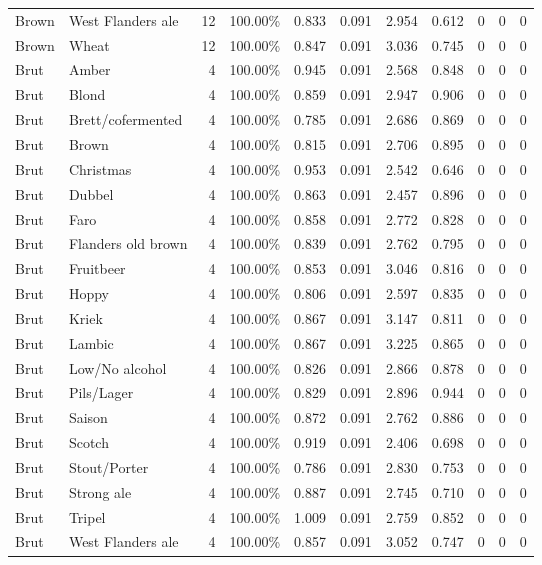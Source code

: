 {\begin{longtable}{llrrrrrrrrr}
Brown & West Flanders ale & 12 & 100.00\% & 0.833 & 0.091 & 2.954 & 0.612 & 0 & 0 & 0 \\
Brown & Wheat & 12 & 100.00\% & 0.847 & 0.091 & 3.036 & 0.745 & 0 & 0 & 0 \\
Brut & Amber & 4 & 100.00\% & 0.945 & 0.091 & 2.568 & 0.848 & 0 & 0 & 0 \\
Brut & Blond & 4 & 100.00\% & 0.859 & 0.091 & 2.947 & 0.906 & 0 & 0 & 0 \\
Brut & Brett/cofermented & 4 & 100.00\% & 0.785 & 0.091 & 2.686 & 0.869 & 0 & 0 & 0 \\
Brut & Brown & 4 & 100.00\% & 0.815 & 0.091 & 2.706 & 0.895 & 0 & 0 & 0 \\
Brut & Christmas & 4 & 100.00\% & 0.953 & 0.091 & 2.542 & 0.646 & 0 & 0 & 0 \\
Brut & Dubbel & 4 & 100.00\% & 0.863 & 0.091 & 2.457 & 0.896 & 0 & 0 & 0 \\
Brut & Faro & 4 & 100.00\% & 0.858 & 0.091 & 2.772 & 0.828 & 0 & 0 & 0 \\
Brut & Flanders old brown & 4 & 100.00\% & 0.839 & 0.091 & 2.762 & 0.795 & 0 & 0 & 0 \\
Brut & Fruitbeer & 4 & 100.00\% & 0.853 & 0.091 & 3.046 & 0.816 & 0 & 0 & 0 \\
Brut & Hoppy & 4 & 100.00\% & 0.806 & 0.091 & 2.597 & 0.835 & 0 & 0 & 0 \\
Brut & Kriek & 4 & 100.00\% & 0.867 & 0.091 & 3.147 & 0.811 & 0 & 0 & 0 \\
Brut & Lambic & 4 & 100.00\% & 0.867 & 0.091 & 3.225 & 0.865 & 0 & 0 & 0 \\
Brut & Low/No alcohol & 4 & 100.00\% & 0.826 & 0.091 & 2.866 & 0.878 & 0 & 0 & 0 \\
Brut & Pils/Lager & 4 & 100.00\% & 0.829 & 0.091 & 2.896 & 0.944 & 0 & 0 & 0 \\
Brut & Saison & 4 & 100.00\% & 0.872 & 0.091 & 2.762 & 0.886 & 0 & 0 & 0 \\
Brut & Scotch & 4 & 100.00\% & 0.919 & 0.091 & 2.406 & 0.698 & 0 & 0 & 0 \\
Brut & Stout/Porter & 4 & 100.00\% & 0.786 & 0.091 & 2.830 & 0.753 & 0 & 0 & 0 \\
Brut & Strong ale & 4 & 100.00\% & 0.887 & 0.091 & 2.745 & 0.710 & 0 & 0 & 0 \\
Brut & Tripel & 4 & 100.00\% & 1.009 & 0.091 & 2.759 & 0.852 & 0 & 0 & 0 \\
Brut & West Flanders ale & 4 & 100.00\% & 0.857 & 0.091 & 3.052 & 0.747 & 0 & 0 & 0 \\

\end{longtable}}
